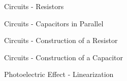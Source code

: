\documentclass[10pt]{examdesign}
\begin{document}
\begin{multiplechoice}
	\begin{question}
		Circuits - Resistors
	
\end{question}

	\begin{question}
		Circuits - Capacitors in Parallel
	
\end{question}

	\begin{question}
				Circuits - Construction of a Resistor	
\end{question}

	\begin{question}
		Circuits - Construction of a Capacitor
	
\end{question}

	\begin{question}
		Photoelectric Effect - Linearization 
	
\end{question}


	

	\end{multiplechoice}
\end{document}
